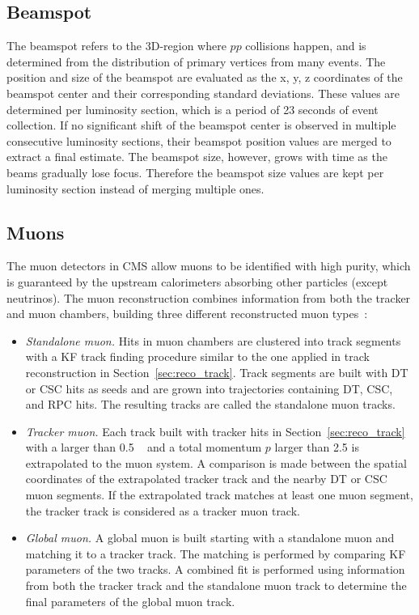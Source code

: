 \subsection{Beamspot}\label{sec:reco_bs}
The beamspot refers to the 3D-region where $pp$ collisions happen, 
and is determined from the distribution of primary vertices from many events.
The position and size of the beamspot are evaluated as the x, y, z coordinates 
of the beamspot center and their corresponding standard deviations.
These values are determined per luminosity section, which is a period of 23 seconds of event collection.
If no significant shift of the beamspot center is observed in multiple consecutive luminosity sections,
their beamspot position values are merged to extract a final estimate.
The beamspot size, however, grows with time as the beams gradually lose focus. 
Therefore the beamspot size values are kept per luminosity section instead of merging multiple ones. 

\subsection{Muons}\label{sec:reco_muon}

The muon detectors in CMS allow muons to be identified with high purity,
which is guaranteed by the upstream calorimeters absorbing other particles (except neutrinos).
The muon reconstruction combines information from both the tracker and muon chambers, 
building three different reconstructed muon types~\cite{Sirunyan_2018}:
\begin{itemize}
      \item \textit{Standalone muon.} 
            Hits in muon chambers are clustered into track segments with a KF track finding procedure
            similar to the one applied in track reconstruction in Section~\ref{sec:reco_track}.
            Track segments are built with DT or CSC hits as seeds and are grown into trajectories containing DT, CSC, and RPC hits. 
            The resulting tracks are called the standalone muon tracks.
      \item \textit{Tracker muon.}
            Each track built with tracker hits in Section~\ref{sec:reco_track} with a \pt larger than 0.5 ~\GeV 
            and a total momentum $p$ larger than 2.5 \GeV is extrapolated to the muon system.
            A comparison is made between the spatial coordinates of the extrapolated tracker track and the nearby DT or CSC muon segments.
            If the extrapolated track matches at least one muon segment,
            the tracker track is considered as a tracker muon track.
      \item \textit{Global muon.}
            A global muon is built starting with a standalone muon and matching it to a tracker track.
            The matching is performed by comparing KF parameters of the two tracks.
            A combined fit is performed using information from both the tracker track and the standalone muon track
            to determine the final parameters of the global muon track. 
\end{itemize}

